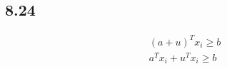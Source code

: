 \documentclass[12pt]{article}
\begin{document}
\subsection*{8.24}

\begin{equation*}
\begin{aligned}
(a+u)^Tx_i \ge b\\
a^Tx_i+u^Tx_i \ge b
\end{aligned}
\end{equation*}

 
\end{document}
